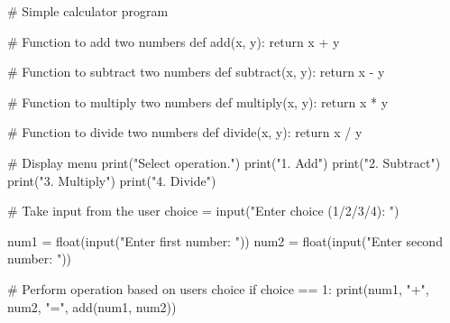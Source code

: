 \documentclass[
  letterpaper,
]{book}
\newenvironment{Shaded}{\begin{snugshade}}{\end{snugshade}}
\newcommand{\BuiltInTok}[1]{\textcolor[rgb]{0.00,0.23,0.31}{#1}}
\newcommand{\CommentTok}[1]{\textcolor[rgb]{0.37,0.37,0.37}{#1}}
\newcommand{\ControlFlowTok}[1]{\textcolor[rgb]{0.00,0.23,0.31}{#1}}
\newcommand{\KeywordTok}[1]{\textcolor[rgb]{0.00,0.23,0.31}{#1}}
\newcommand{\NormalTok}[1]{\textcolor[rgb]{0.00,0.23,0.31}{#1}}
\newcommand{\OperatorTok}[1]{\textcolor[rgb]{0.37,0.37,0.37}{#1}}
\newcommand{\StringTok}[1]{\textcolor[rgb]{0.13,0.47,0.30}{#1}}
\begin{document}
\begin{tcolorbox}[enhanced jigsaw, opacityback=0, opacitybacktitle=0.6, colback=white, rightrule=.15mm, coltitle=black, colframe=quarto-callout-note-color-frame, colbacktitle=quarto-callout-note-color!10!white, bottomrule=.15mm, bottomtitle=1mm, breakable, title=\textcolor{quarto-callout-note-color}{\faInfo}\hspace{0.5em}{프롬프트: write python code of calculator}, titlerule=0mm, leftrule=.75mm, toptitle=1mm, left=2mm, arc=.35mm, toprule=.15mm]

\begin{Shaded}
\begin{Highlighting}[]
\CommentTok{\# Simple calculator program}

\CommentTok{\# Function to add two numbers}
\KeywordTok{def}\NormalTok{ add(x, y):}
    \ControlFlowTok{return}\NormalTok{ x }\OperatorTok{+}\NormalTok{ y}

\CommentTok{\# Function to subtract two numbers}
\KeywordTok{def}\NormalTok{ subtract(x, y):}
    \ControlFlowTok{return}\NormalTok{ x }\OperatorTok{{-}}\NormalTok{ y}

\CommentTok{\# Function to multiply two numbers}
\KeywordTok{def}\NormalTok{ multiply(x, y):}
    \ControlFlowTok{return}\NormalTok{ x }\OperatorTok{*}\NormalTok{ y}

\CommentTok{\# Function to divide two numbers}
\KeywordTok{def}\NormalTok{ divide(x, y):}
    \ControlFlowTok{return}\NormalTok{ x }\OperatorTok{/}\NormalTok{ y}

\CommentTok{\# Display menu}
\BuiltInTok{print}\NormalTok{(}\StringTok{"Select operation."}\NormalTok{)}
\BuiltInTok{print}\NormalTok{(}\StringTok{"1. Add"}\NormalTok{)}
\BuiltInTok{print}\NormalTok{(}\StringTok{"2. Subtract"}\NormalTok{)}
\BuiltInTok{print}\NormalTok{(}\StringTok{"3. Multiply"}\NormalTok{)}
\BuiltInTok{print}\NormalTok{(}\StringTok{"4. Divide"}\NormalTok{)}

\CommentTok{\# Take input from the user}
\NormalTok{choice }\OperatorTok{=} \BuiltInTok{input}\NormalTok{(}\StringTok{"Enter choice (1/2/3/4): "}\NormalTok{)}

\NormalTok{num1 }\OperatorTok{=} \BuiltInTok{float}\NormalTok{(}\BuiltInTok{input}\NormalTok{(}\StringTok{"Enter first number: "}\NormalTok{))}
\NormalTok{num2 }\OperatorTok{=} \BuiltInTok{float}\NormalTok{(}\BuiltInTok{input}\NormalTok{(}\StringTok{"Enter second number: "}\NormalTok{))}

\CommentTok{\# Perform operation based on user\textquotesingle{}s choice}
\ControlFlowTok{if}\NormalTok{ choice }\OperatorTok{==} \StringTok{\textquotesingle{}1\textquotesingle{}}\NormalTok{:}
    \BuiltInTok{print}\NormalTok{(num1, }\StringTok{"+"}\NormalTok{, num2, }\StringTok{"="}\NormalTok{, add(num1, num2))}


\end{Highlighting}
\end{Shaded}
\end{tcolorbox}
\end{document}
